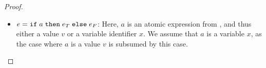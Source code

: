 \begin{proof}
\begin{itemize}
		Now assume $\Gamma \vdash x \colon \BOOL  \leadsto (F_\BOOL(x), \TRUE, []) = (x, \TRUE, [])$, which allows us to compile the observe statement as $\Gamma \vdash \OBSERVE{x} \colon \BOOL  \leadsto (\TRUE, x, [])$.
		Now let $v_x\colon \BOOL$ be the value substituted for $x$. 
		We make a case distinction on $v_x$:
		\begin{itemize}
			\item $v_x = \TRUE$: We have $\llbracket \OBSERVE{x}[x\mapsto \TRUE]\rrbracket = \llbracket \OBSERVE{\TRUE}\rrbracket = \{1|\TRUE\rangle\}$.
			The lifted MDP for the reduced ADD of $(\TRUE, x[x\mapsto \TRUE]\, []) = (\TRUE, \TRUE, [])$ only consists of a single state for $\TRUE$, and thus we trivially have $Pr^{\Theta}_{\mathcal{M}^u_o}(\lozenge \TRUE) = 1$ for all schedulers via .
			\item $v_x = \FALSE$: We have $\llbracket \OBSERVE{x}[x\mapsto \FALSE]\rrbracket = \llbracket \OBSERVE{\FALSE}\rrbracket = \{0|\TRUE\rangle\}$.
			The lifted MDP for the reduced ADD of $(\TRUE, [x\mapsto \FALSE]\, []) = (\TRUE, \FALSE, [])$ only consists of a single state for $R$, and thus we trivially have $Pr^{\Theta}_{\mathcal{M}^u_o}(\lozenge \TRUE) = 0$ and $Pr^{\Theta}_{\mathcal{M}^u_o}(\lozenge \FALSE) = 0$ for all schedulers. \\
		\end{itemize}
		
		
		\item $e = \textnormal{\texttt{if}}\;{a}\;\texttt{then}\; e_T \; \textnormal{\texttt{else}}\; e_F $: Here, $a$ is an atomic expression from \AEXP, and thus either a value $v$ or a variable identifier $x$. 
		We assume that $a$ is a variable $x$, as the case where $a$ is a value $v$ is subsumed by this case. 


\end{itemize}
\end{proof}
